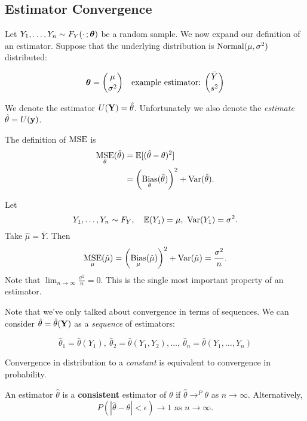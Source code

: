 
\subsection{Estimator Convergence}
\begin{eg}
Let $Y_1,\dots,Y_n\sim F_Y( \cdot \, ; {\boldsymbol{\theta}})$ be a random sample. We now expand our definition of an estimator. Suppose that the underlying distribution is $\operatorname*{Normal}(\mu,\sigma^2)$ distributed:

$$
{\boldsymbol{\theta}}=\binom{\mu}{\sigma^2} \quad \text{example estimator: } \binom{\bar Y}{s^2}
$$

\end{eg}
We denote the estimator $U(\mathbf Y)=\hat \theta$. Unfortunately we also denote the \textit{estimate} $\hat \theta=U(\mathbf y)$.

\begin{recall}
The definition of $\operatorname*{MSE}$ is
\begin{align*}
    \operatorname*{MSE}_\theta(\hat \theta)&=\mathbb E[(\hat \theta -\theta)^2] \\
    &=\left(\operatorname*{Bias}_\theta(\hat \theta)\right)^2+\operatorname*{Var}(\hat \theta).
\end{align*}
\end{recall}

\begin{eg}
Let $$Y_1,\dots, Y_n\sim F_Y, \quad \mathbb E(Y_1)=\mu, \ \operatorname*{Var}(Y_1)=\sigma^2.$$
Take $\hat \mu=\bar Y.$ Then
$$
\operatorname*{MSE}_\mu(\hat \mu)=\left(\operatorname*{Bias}_\mu(\hat \mu)\right)^2+\operatorname*{Var}(\hat \mu)=\frac{\sigma^2}{n}.
$$
Note that $\lim_{n\to \infty} \frac{\sigma^2}{n}=0.$ This is the single most important property of an estimator. 
\end{eg}

Note that we've only talked about convergence in terms of sequences. We can consider $\hat \theta =\hat \theta(\mathbf Y)$ as a \textit{sequence} of estimators:

$$\hat\theta_1=\hat \theta(Y_1), \ \hat \theta_2=\hat \theta(Y_1,Y_2),\dots, \ \hat \theta_n=\hat \theta(Y_1,\dots,Y_n)$$

\begin{remark}
Convergence in distribution to a \textit{constant} is equivalent to convergence in probability. 
\end{remark}

\begin{definition}
An estimator $\hat \theta$ is a \textbf{consistent} estimator of $\theta$ if $\hat \theta \to^P \theta$ as $n\to \infty.$ Alternatively,
$$
P(|\hat\theta -\theta|<\epsilon)\to 1 \text{ as } n\to \infty.
$$
\end{definition}

